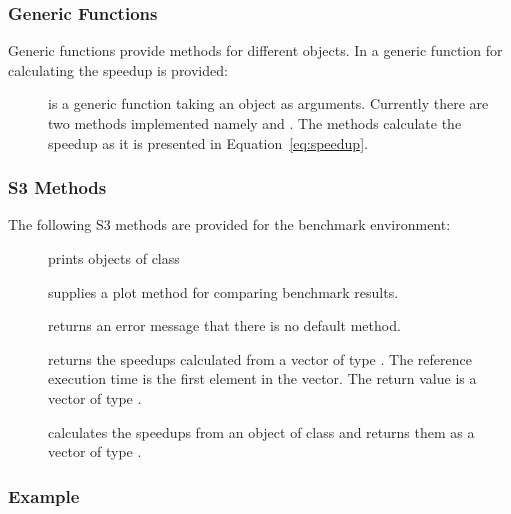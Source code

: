 \subsubsection{Generic Functions}

Generic functions provide methods for different objects. In 
a generic function for calculating the speedup is provided:

\begin{description}
\item[] is a generic function taking an object as
  arguments. Currently there are two methods implemented namely
   and . The methods
  calculate the speedup as it is presented in
  Equation~\ref{eq:speedup}.
\end{description}

\subsubsection{S3 Methods}

The following S3 methods are provided for the benchmark environment:

\begin{description}
\item[] prints objects of class 
\item[] supplies a plot method for comparing
  benchmark results.
\item[] returns an error message that there is
  no default method. 
\item[] returns the speedups calculated from a
  vector of type . The reference execution time is  the
  first element in the vector. The return value is a vector of type
  . 
\item[] calculates the speedups from an object
  of class  and returns them as a vector of type
  . 
\end{description}

\subsubsection{Example}

